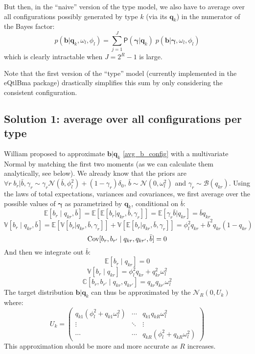 \documentclass[10pt]{article}
\newcommand{\Prd}{\mathsf{P}} %
\newcommand{\Exp}{\mathbb{E}} %
\newcommand{\Var}{\mathbb{V}} %
\newcommand{\Cov}{\mathbb{C}} %
\newcommand{\Norm}{{\mathcal{N}}} %
\begin{document}
But then, in the ``naive'' version of the type model, we also have to average over all configurations possibly generated by type $k$ (via its $\bm{q}_k$) in the numerator of the Bayes factor:
\begin{equation}
  \label{avg_b_config}
  p(\bm{b} | \bm{q}_k, \omega_l, \phi_l) = \sum_{j=1}^J \Prd(\bm{\gamma} | \bm{q}_k) \; p(\bm{b} | \bm{\gamma}, \omega_l, \phi_l)
\end{equation}
which is clearly intractable when $J=2^R-1$ is large.

Note that the first version of the ``type'' model (currently implemented in the eQtlBma package) drastically simplifies this sum by only considering the consistent configuration.


\subsection{Solution 1: average over all configurations per type}

William proposed to approximate $\bm{b} | \bm{q}_k$ \eqref{avg_b_config} with a multivariate Normal by matching the first two moments (as we can calculate them analytically, see below).
We already know that the priors are $\forall r \; b_r|\bar{b},\gamma_r \sim \gamma_r \Norm(\bar{b},\phi_l^2) + (1-\gamma_r) \delta_0$, $\bar{b} \sim \Norm(0,\omega_l^2)$ and $\gamma_r \sim \mathcal{B}(q_{kr})$.
Using the laws of total expectations, variances and covariances, we first average over the possible values of $\bm{\gamma}$ as parametrized by $\bm{q}_k$, conditional on $\bar{b}$:
\[
\Exp[b_r \; | \; q_{kr}, \bar{b}] = \Exp[ \Exp[b_r | q_{kr}, \bar{b}, \gamma_r] ] = \Exp[\gamma_r \bar{b} | q_{kr}] = \bar{b} q_{kr}
\]
\[
\Var[b_r \; | \; q_{kr}, \bar{b}] = \Exp[\Var[b_r | q_{kr}, \bar{b}, \gamma_r]] + \Var[\Exp[b_r | q_{kr}, \bar{b}, \gamma_r]] = \phi_l^2 q_{kr} + \bar{b}^2 q_{kr} (1-q_{kr})
\]
\[
{\rm Cov}[b_r, b_{r'} \; | \; q_{kr}, q_{kr'}, \bar{b}] = 0
\]
And then we integrate out $\bar{b}$:
\[
\Exp[b_r \; | \; q_{kr}] = 0
\]
\[
\Var[b_r \; | \; q_{kr}] = \phi_l^2 q_{kr} + q_{kr}^2 \omega_l^2
\]
\[
\Cov[b_r, b_{r'} \; | \; q_{kr}, q_{kr'}] = q_{kr} q_{kr'} \omega_l^2
\]
The target distribution $\bm{b} | \bm{q}_k$ can thus be approximated by the $\Norm_R(0,U_k)$ where:
\[
U_k = 
\begin{pmatrix}
  q_{k1} (\phi_l^2 + q_{k1} \omega_l^2) & \cdots & q_{k1} q_{kR} \omega_l^2 \\
  \vdots & \ddots & \vdots \\
  \cdots & \cdots & q_{kR} (\phi_l^2 + q_{kR} \omega_l^2)
\end{pmatrix}
\]
This approximation should be more and more accurate as $R$ increases.
\end{document}
